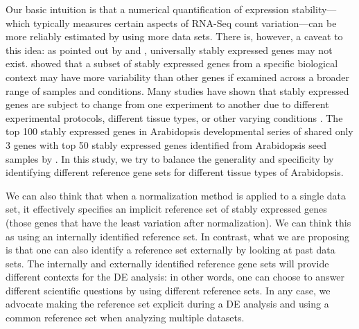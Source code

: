 	Our basic intuition is that a numerical quantification of expression
	stability---which typically measures certain aspects of RNA-Seq count
	variation---can be more reliably estimated by using more data sets.  There is,
	however, a caveat to this idea: as pointed out by \cite{fernandes2008selection} and \cite{hruz2011refgenes},
	universally stably expressed genes may not exist. \cite{hruz2011refgenes} showed that a subset of stably
	expressed genes from a specific biological context may have more variability
	than other genes if examined across a broader range of samples and conditions.
	Many studies have shown that stably expressed genes are subject to change from
	one experiment to another due to different experimental protocols, different
	tissue types, or other varying conditions \citep{reid2006optimized,
		hong2010identification}.  The top 100 stably expressed genes in Arabidopsis
	developmental series of \citet{czechowski2005genome} shared only 3 genes with
	top 50 stably expressed genes identified from Arabidopsis seed samples by
	\citet{dekkers2012identification}.  In this study, we try to balance the
	generality and specificity by identifying different reference gene sets for
	different tissue types of Arabidopsis. 
	
	
	
	We can also think that when a normalization method is applied to a single data
	set, it effectively specifies an implicit reference set of stably expressed
	genes (those genes that have the least variation after normalization). We can think
	this as using an internally identified reference set. In contrast, what we are
	proposing is that one can also identify a reference set externally by looking
	at past data sets. The internally and externally identified reference gene
	sets will provide different contexts for the DE analysis: in other words, one
	can choose to answer different scientific questions by using different
	reference sets. In any case, we advocate  making the reference set explicit
	during a DE analysis and using a common reference set when analyzing multiple
	datasets. 
	
	
